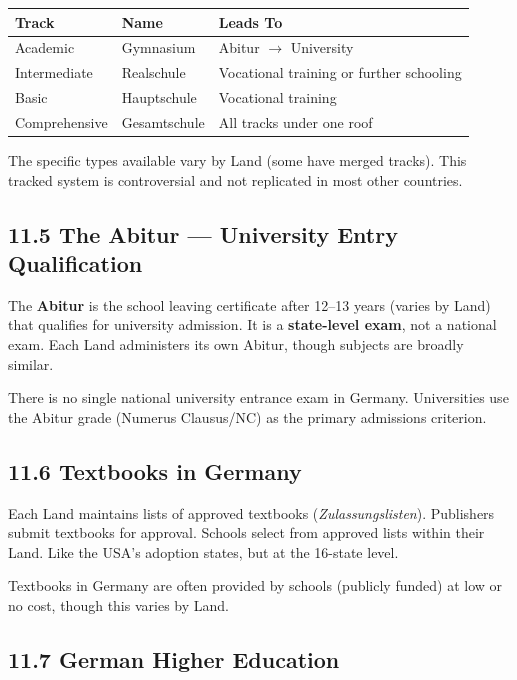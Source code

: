 \begin{center}\small
	\begin{tabularx}{0.9\textwidth}{@{} l l X @{}}
		\toprule
		\textbf{Track} & \textbf{Name} & \textbf{Leads To}                        \\
		\midrule
		Academic       & Gymnasium     & Abitur $\rightarrow$ University          \\
		Intermediate   & Realschule    & Vocational training or further schooling \\
		Basic          & Hauptschule   & Vocational training                      \\
		Comprehensive  & Gesamtschule  & All tracks under one roof                \\
		\bottomrule
	\end{tabularx}
\end{center}

The specific types available vary by Land (some have merged tracks). This tracked system is controversial and not replicated in most other countries.


	\subsection{11.5 The Abitur --- University Entry Qualification}

	The \textbf{Abitur} is the school leaving certificate after 12--13 years (varies by Land) that qualifies for university admission. It is a \textbf{state-level exam}, not a national exam. Each Land administers its own Abitur, though subjects are broadly similar.

	There is no single national university entrance exam in Germany. Universities use the Abitur grade (Numerus Clausus/NC) as the primary admissions criterion.

	\subsection{11.6 Textbooks in Germany}

	Each Land maintains lists of approved textbooks (\textit{Zulassungslisten}). Publishers submit textbooks for approval. Schools select from approved lists within their Land. Like the USA's adoption states, but at the 16-state level.

	Textbooks in Germany are often provided by schools (publicly funded) at low or no cost, though this varies by Land.

	\subsection{11.7 German Higher Education}

